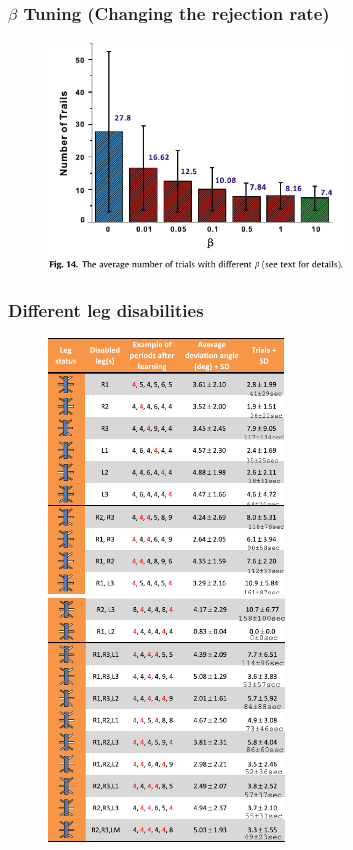 \documentclass{beamer}
\begin{document}
\begin{frame}
\frametitle{$\beta$ Tuning (Changing the rejection rate)}
\begin{figure}
\center
\includegraphics[width=0.7\textwidth]{figs/beta-tuning.pdf}
\end{figure}
\end{frame}

\begin{frame}
\frametitle{Different leg disabilities}
\vspace*{-0.6cm}
\begin{figure}
\hspace*{-1cm}
\includegraphics[width=0.56\textwidth]{figs/disable-legs-list-1-a.pdf}
\includegraphics[width=0.56\textwidth]{figs/disable-legs-list-2-a.pdf}
\end{figure}
\end{frame}
\end{document}
